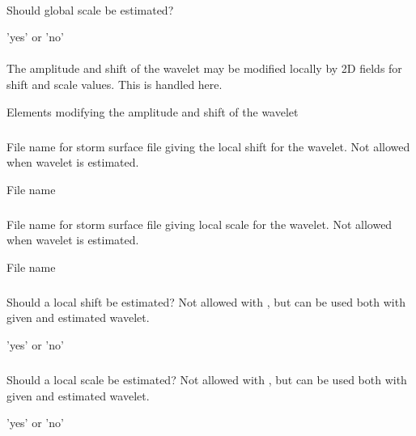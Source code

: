 \paragraph{}
 \slist
   \item \Description Should global scale be estimated?
   \item \Argument 'yes' or 'no'
   \item \Default
 \elist

\paragraph{}
 \slist
   \item \Description The amplitude and shift of the wavelet may be modified locally by 2D fields for shift and scale values. This is handled here.
   \item \Argument Elements modifying the amplitude and shift of the wavelet
   \item \Default
 \elist

\subparagraph{}
 \slist
   \item \Description File name for storm surface file giving the local shift for the wavelet. Not allowed when wavelet is estimated.
   \item \Argument File name
   \item \Default
 \elist

\subparagraph{}
 \slist
   \item \Description File name for storm surface file giving local scale for the wavelet. Not allowed when wavelet is estimated.
   \item \Argument File name
   \item \Default
 \elist

\subparagraph{}
 \slist
   \item \Description Should a local shift be estimated? Not allowed with , but can be used both with given and estimated wavelet.
   \item \Argument 'yes' or 'no'
   \item \Default
 \elist

\subparagraph{}
 \slist
   \item \Description Should a local scale be estimated? Not allowed with , but can be used both with given and estimated wavelet.
   \item \Argument 'yes' or 'no'
   \item \Default
 \elist


